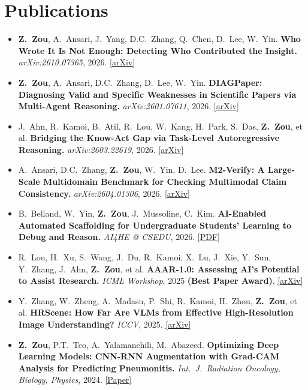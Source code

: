 \documentclass[letterpaper,10pt]{article}
\newenvironment{cvlist}
  {\begin{itemize}[leftmargin=0.16in, label=\textbullet, itemsep=2pt, parsep=0pt, topsep=2pt]\small}
  {\end{itemize}\vspace{3pt}}
\begin{document}
\section{Publications}
\begin{cvlist}
  \item \textbf{Z.\ Zou}, A.\ Ansari, J.\ Yang, D.C.\ Zhang, Q.\ Chen, D.\ Lee, W.\ Yin.
        \textbf{Who Wrote It Is Not Enough: Detecting Who Contributed the Insight.}
        \textit{arXiv:2610.07365}, 2026. \href{https://arxiv.org/abs/2610.07365}{[arXiv]}
  \item \textbf{Z.\ Zou}, A.\ Ansari, D.C.\ Zhang, D.\ Lee, W.\ Yin.
        \textbf{DIAGPaper: Diagnosing Valid and Specific Weaknesses in Scientific Papers via Multi-Agent Reasoning.}
        \textit{arXiv:2601.07611}, 2026. \href{https://arxiv.org/abs/2601.07611}{[arXiv]}
  \item J.\ Ahn, R.\ Kamoi, B.\ Atil, R.\ Lou, W.\ Kang, H.\ Park, S.\ Das, \textbf{Z.\ Zou}, et al.
        \textbf{Bridging the Know-Act Gap via Task-Level Autoregressive Reasoning.}
        \textit{arXiv:2603.22619}, 2026. \href{https://arxiv.org/abs/2603.22619}{[arXiv]}
  \item A.\ Ansari, D.C.\ Zhang, \textbf{Z.\ Zou}, W.\ Yin, D.\ Lee.
        \textbf{M2-Verify: A Large-Scale Multidomain Benchmark for Checking Multimodal Claim Consistency.}
        \textit{arXiv:2604.01306}, 2026. \href{https://arxiv.org/abs/2604.01306}{[arXiv]}
  \item B.\ Belland, W.\ Yin, \textbf{Z.\ Zou}, J.\ Mussoline, C.\ Kim.
        \textbf{AI-Enabled Automated Scaffolding for Undergraduate Students' Learning to Debug and Reason.}
        \textit{AI4HE @ CSEDU}, 2026. \href{https://www.scitepress.org/Papers/2026/150898/150898.pdf}{[PDF]}
  \item R.\ Lou, H.\ Xu, S.\ Wang, J.\ Du, R.\ Kamoi, X.\ Lu, J.\ Xie, Y.\ Sun, Y.\ Zhang, J.\ Ahn, \textbf{Z.\ Zou}, et al.
        \textbf{AAAR-1.0: Assessing AI's Potential to Assist Research.}
        \textit{ICML Workshop}, 2025 \textbf{(Best Paper Award)}. \href{https://arxiv.org/abs/2410.22394}{[arXiv]}
  \item Y.\ Zhang, W.\ Zheng, A.\ Madasu, P.\ Shi, R.\ Kamoi, H.\ Zhou, \textbf{Z.\ Zou}, et al.
        \textbf{HRScene: How Far Are VLMs from Effective High-Resolution Image Understanding?}
        \textit{ICCV}, 2025. \href{https://arxiv.org/abs/2504.18406}{[arXiv]}
  \item \textbf{Z.\ Zou}, P.T.\ Teo, A.\ Yalamanchili, M.\ Abazeed.
        \textbf{Optimizing Deep Learning Models: CNN-RNN Augmentation with Grad-CAM Analysis for Predicting Pneumonitis.}
        \textit{Int.\ J.\ Radiation Oncology, Biology, Physics}, 2024. \href{https://www.redjournal.org/article/S0360-3016(24)02234-X/fulltext}{[Paper]}
\end{cvlist}
\end{document}
